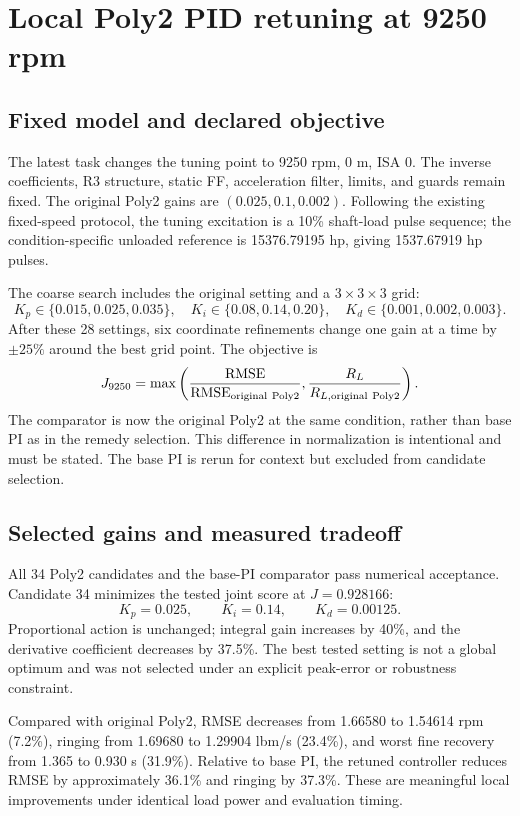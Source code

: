 \documentclass[11pt,a4paper,oneside]{report}
\newcommand{\RMSE}{\operatorname{RMSE}}
\begin{document}
\chapter{Local Poly2 PID retuning at 9250 rpm}
\section{Fixed model and declared objective}
The latest task changes the tuning point to 9250 rpm, 0 m, ISA 0. The inverse coefficients, R3 structure, static FF, acceleration filter, limits, and guards remain fixed. The original Poly2 gains are $(0.025,0.1,0.002)$. Following the existing fixed-speed protocol, the tuning excitation is a 10\% shaft-load pulse sequence; the condition-specific unloaded reference is 15376.79195 hp, giving 1537.67919 hp pulses.

The coarse search includes the original setting and a $3\times3\times3$ grid:
\begin{equation}
K_p\in\{0.015,0.025,0.035\},\quad
K_i\in\{0.08,0.14,0.20\},\quad
K_d\in\{0.001,0.002,0.003\}.
\end{equation}
After these 28 settings, six coordinate refinements change one gain at a time by $\pm25\%$ around the best grid point. The objective is
\begin{equation}
J_{9250}=\max\left(\frac{\RMSE}{\RMSE_{\rm original\ Poly2}},
\frac{R_L}{R_{L,\rm original\ Poly2}}\right).
\end{equation}
The comparator is now the original Poly2 at the same condition, rather than base PI as in the remedy selection. This difference in normalization is intentional and must be stated. The base PI is rerun for context but excluded from candidate selection.

\section{Selected gains and measured tradeoff}
All 34 Poly2 candidates and the base-PI comparator pass numerical acceptance. Candidate 34 minimizes the tested joint score at $J=0.928166$:
\begin{equation}
\boxed{K_p=0.025,\qquad K_i=0.14,\qquad K_d=0.00125.}
\end{equation}
Proportional action is unchanged; integral gain increases by 40\%, and the derivative coefficient decreases by 37.5\%. The best tested setting is not a global optimum and was not selected under an explicit peak-error or robustness constraint.


Compared with original Poly2, RMSE decreases from 1.66580 to 1.54614 rpm (7.2\%), ringing from 1.69680 to 1.29904 lbm/s (23.4\%), and worst fine recovery from 1.365 to 0.930 s (31.9\%). Relative to base PI, the retuned controller reduces RMSE by approximately 36.1\% and ringing by 37.3\%. These are meaningful local improvements under identical load power and evaluation timing.
\end{document}
